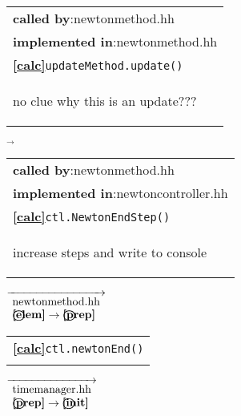 \begin{landscape}
{\begin{tabular}{|l|}
      \hline
      \textbf{called by}:newtonmethod.hh\\
      \textbf{implemented in}:newtonmethod.hh \\  
      \textbf{\textcircled{\ref{calc}}}\verb+updateMethod.update()+ \\
    \begin{scriptsize}no clue why this is an update???\end{scriptsize}\\\hline 
  \end{tabular}
    $\overrightarrow{
    }$
    \begin{tabular}{|l|}
      \hline
      \textbf{called by}:newtonmethod.hh\\
      \textbf{implemented in}:newtoncontroller.hh\\  
      \textbf{\textcircled{\ref{calc}}}\verb+ctl.NewtonEndStep()+ \\
    \begin{scriptsize}increase steps and write to console\end{scriptsize}\\\hline 
  \end{tabular}
    {\scriptsize$\overrightarrow{
    \begin{array}{l}
     \textnormal{newtonmethod.hh}\\
     \textbf{\textcircled{\ref{elem}}} \rightarrow \textbf{\textcircled{\ref{prep}}}
    \end{array}
    }$}
    \begin{tabular}{|l|}
      \hline
      \textbf{\textcircled{\ref{calc}}}\verb+ctl.newtonEnd()+ \\
    \begin{scriptsize}\end{scriptsize}\\\hline 
  \end{tabular}
    {\scriptsize$\overrightarrow{
    \begin{array}{l}
    \textnormal{timemanager.hh}\\
    \textbf{\textcircled{\ref{prep}}} \rightarrow \textbf{\textcircled{\ref{init}}}
    \end{array}
    }$}
}
\end{landscape}


\normalsize